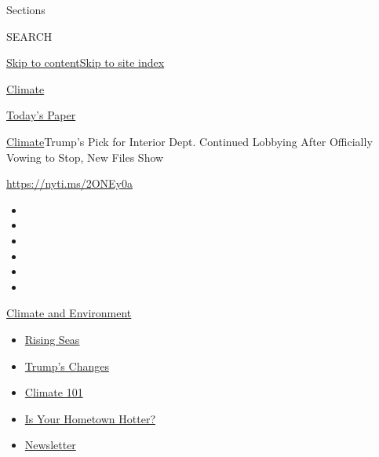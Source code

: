 Sections

SEARCH

\protect\hyperlink{site-content}{Skip to
content}\protect\hyperlink{site-index}{Skip to site index}

\href{https://www.nytimes.com/section/climate}{Climate}

\href{https://myaccount.nytimes.com/auth/login?response_type=cookie\&client_id=vi}{}

\href{https://www.nytimes.com/section/todayspaper}{Today's Paper}

\href{/section/climate}{Climate}\textbar{}Trump's Pick for Interior
Dept. Continued Lobbying After Officially Vowing to Stop, New Files Show

\url{https://nyti.ms/2ONEy0a}

\begin{itemize}
\item
\item
\item
\item
\item
\item
\end{itemize}

\href{https://www.nytimes.com/section/climate?action=click\&pgtype=Article\&state=default\&region=TOP_BANNER\&context=storylines_menu}{Climate
and Environment}

\begin{itemize}
\tightlist
\item
  \href{https://www.nytimes.com/2020/07/30/climate/sea-level-inland-floods.html?action=click\&pgtype=Article\&state=default\&region=TOP_BANNER\&context=storylines_menu}{Rising
  Seas}
\item
  \href{https://www.nytimes.com/interactive/2020/climate/trump-environment-rollbacks.html?action=click\&pgtype=Article\&state=default\&region=TOP_BANNER\&context=storylines_menu}{Trump's
  Changes}
\item
  \href{https://www.nytimes.com/interactive/2020/04/19/climate/climate-crash-course-1.html?action=click\&pgtype=Article\&state=default\&region=TOP_BANNER\&context=storylines_menu}{Climate
  101}
\item
  \href{https://www.nytimes.com/interactive/2018/08/30/climate/how-much-hotter-is-your-hometown.html?action=click\&pgtype=Article\&state=default\&region=TOP_BANNER\&context=storylines_menu}{Is
  Your Hometown Hotter?}
\item
  \href{https://www.nytimes.com/newsletters/climate-change?action=click\&pgtype=Article\&state=default\&region=TOP_BANNER\&context=storylines_menu}{Newsletter}
\end{itemize}

